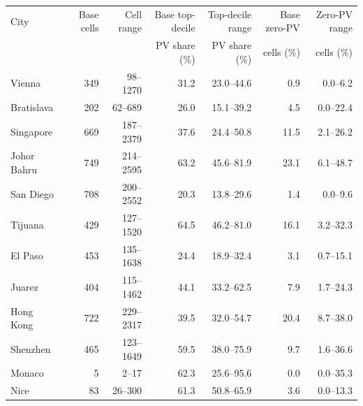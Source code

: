 \begin{tabular}{@{}lrrrrrr@{}}
\toprule
City & Base cells & Cell range & Base top-decile & Top-decile range & Base zero-PV & Zero-PV range \\
 & & & PV share (\%) & PV share (\%) & cells (\%) & cells (\%) \\
\midrule
Vienna & 349 & 98--1270 & 31.2 & 23.0--44.6 & 0.9 & 0.0--6.2 \\
Bratislava & 202 & 62--689 & 26.0 & 15.1--39.2 & 4.5 & 0.0--22.4 \\
Singapore & 669 & 187--2379 & 37.6 & 24.4--50.8 & 11.5 & 2.1--26.2 \\
Johor Bahru & 749 & 214--2595 & 63.2 & 45.6--81.9 & 23.1 & 6.1--48.7 \\
San Diego & 708 & 200--2552 & 20.3 & 13.8--29.6 & 1.4 & 0.0--9.6 \\
Tijuana & 429 & 127--1520 & 64.5 & 46.2--81.0 & 16.1 & 3.2--32.3 \\
El Paso & 453 & 135--1638 & 24.4 & 18.9--32.4 & 3.1 & 0.7--15.1 \\
Juarez & 404 & 115--1462 & 44.1 & 33.2--62.5 & 7.9 & 1.7--24.3 \\
Hong Kong & 722 & 229--2317 & 39.5 & 32.0--54.7 & 20.4 & 8.7--38.0 \\
Shenzhen & 465 & 123--1649 & 59.5 & 38.0--75.9 & 9.7 & 1.6--36.6 \\
Monaco & 5 & 2--17 & 62.3 & 25.6--95.6 & 0.0 & 0.0--35.3 \\
Nice & 83 & 26--300 & 61.3 & 50.8--65.9 & 3.6 & 0.0--13.3 \\
\bottomrule
\end{tabular}

